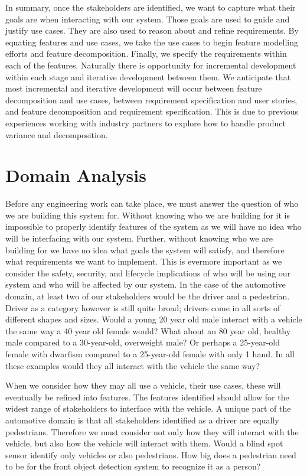 In summary, once the stakeholders are identified, we want to capture what their goals are when interacting with our system. Those goals are used to guide and justify use cases. They are also used to reason about and refine requirements. By equating features and use cases, we take the use cases to begin feature modelling efforts and feature decomposition. Finally, we specify the requirements within each of the features. Naturally there is opportunity for incremental development within each stage and iterative development between them. We anticipate that most incremental and iterative development will occur between feature decomposition and use cases, between requirement specification and user stories, and feature decomposition and requirement specification. This is due to previous experiences working with industry partners to explore how to handle product variance and decomposition.

\section{Domain Analysis}

Before any engineering work can take place, we must answer the question of who we are building this system for. Without knowing who we are building for it is impossible to properly identify features of the system as we will have no idea who will be interfacing with our system. Further, without knowing who we are building for we have no idea what goals the system will satisfy, and therefore what requirements we want to implement. This is evermore important as we consider the safety, security, and lifecycle implications of who will be using our system and who will be affected by our system. In the case of the automotive domain, at least two of our stakeholders would be the driver and a pedestrian. Driver as a category however is still quite broad; drivers come in all sorts of different shapes and sizes. Would a young 20 year old male interact with a vehicle the same way a 40 year old female would? What about an 80 year old, healthy male compared to a 30-year-old, overweight male? Or perhaps a 25-year-old female with dwarfism compared to a 25-year-old female with only 1 hand. In all these examples would they all interact with the vehicle the same way? 

When we consider how they may all use a vehicle, their use cases, these will eventually be refined into features. The features identified should allow for the widest range of stakeholders to interface with the vehicle. A unique part of the automotive domain is that all stakeholders identified as a driver are equally pedestrians. Therefore we must consider not only how they will interact with the vehicle, but also how the vehicle will interact with them. Would a blind spot sensor identify only vehicles or also pedestrians. How big does a pedestrian need to be for the front object detection system to recognize it as a person? 

